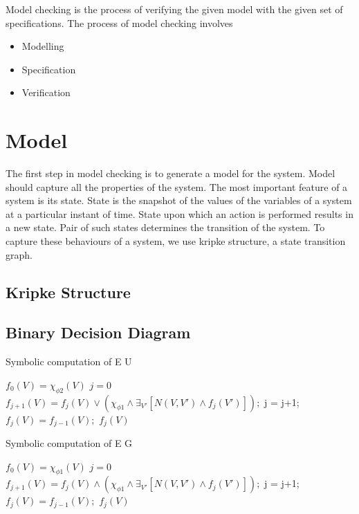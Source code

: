 Model checking is the process of verifying the given model with the given set of specifications. The process of model checking involves
\begin{itemize}
\item Modelling
\item Specification
\item Verification
\end{itemize}

\section{Model}
The first step in model checking is to generate a model for the system. Model should capture all the properties of the system. The most important feature of a system is its state. State is the snapshot of the values of the variables of a system at a particular instant of time. State upon which an action is performed results in a new state. Pair of such states determines the transition of the system. To capture these behaviours of a system, we use kripke structure, a state transition graph.
\subsection{Kripke Structure}

\subsection{Binary Decision Diagram}



\begin{algorithm}
\begin{algorithmic}
\caption{Symbolic computation of E U}
\label{Symbolic computation of E U}
\State $f_0(V) = \chi_{\phi 2}(V)$
\State $j = 0$
\Repeat
\State $f_{j+1}(V) = f_j(V) \lor (\chi_{\phi 1} \land \exists_{V'}[N(V,V')\land f_j(V')]);$
\State j = j+1;
\Until  $f_j(V) = f_{j-1}(V);$
\State
\Return $f_j(V)$

\EndProcedure
\end{algorithmic}
\end{algorithm}

\begin{algorithm}
\begin{algorithmic}[h]
\caption{Symbolic computation of E G}
\label{Symbolic computation of E G}
\State $f_0(V) = \chi_{\phi 1}(V)$
\State $j = 0$
\Repeat
\State $f_{j+1}(V) = f_j(V) \land (\chi_{\phi 1} \land \exists_{V'}[N(V,V')\land f_j(V')]);$
\State j = j+1;
\Until  $f_j(V) = f_{j-1}(V);$
\State
\Return $f_j(V)$

\EndProcedure
\end{algorithmic}
\end{algorithm}


